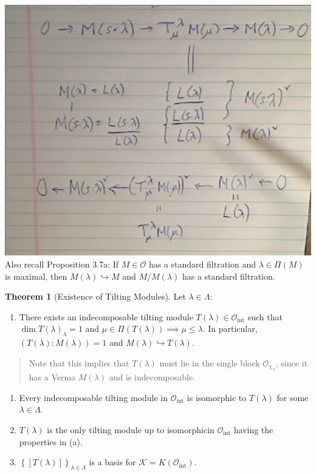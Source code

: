 \documentclass[11pt]{scrartcl}
\theoremstyle{definition}
\theoremstyle{theorem}
\newtheorem{theorem}{Theorem}[section]
\theoremstyle{proof}
\theoremstyle{definition}
\theoremstyle{break}
\theoremstyle{problem}
\providecommand{\tightlist}{%
  \setlength{\itemsep}{0pt}\setlength{\parskip}{0pt}}
\newcommand{\injects}[0]{\hookrightarrow}
\newcommand{\OO}[0]{{\mathcal{O}}}
\newcommand{\mck}[0]{{\mathcal{K}}}
\newcommand{\theset}[1]{\left\{{#1}\right\}}
\begin{document}
\includegraphics{figures/image_2020-04-24-09-25-20.png}\\

Also recall Proposition 3.7a: If \(M\in \OO\) has a standard filtration
and \(\lambda \in \Pi(M)\) is maximal, then \(M(\lambda) \injects M\)
and \(M/M(\lambda)\) has a standard filtration.

\begin{theorem}[Existence of  Tilting Modules]

Let \(\lambda \in \Lambda\):

\begin{enumerate}
\def\labelenumi{\alph{enumi}.}
\tightlist
\item
  There exists an indecomposable tilting module
  \(T(\lambda) \in \OO_{\text{int}}\) such that
  \(\dim T(\lambda)_\lambda = 1\) and
  \(\mu \in \Pi(T(\lambda)) \implies \mu \leq \lambda\). In particular,
  \(( T(\lambda): M(\lambda) ) = 1\) and
  \(M(\lambda) \injects T(\lambda)\).
\end{enumerate}

\begin{quote}
Note that this implies that \(T(\lambda)\) must lie in the single block
\(\OO_{\chi_\lambda}\), since it has a Verma \(M(\lambda)\) and is
indecomposable.
\end{quote}

\begin{enumerate}
\def\labelenumi{\alph{enumi}.}
\setcounter{enumi}{1}
\tightlist
\item
  Every indecomposable tilting module in \(\OO_{\text{int}}\) is
  isomorphic to \(T(\lambda)\) for some \(\lambda \in \Lambda\).
\item
  \(T(\lambda)\) is the only tilting module up to isomorphicin
  \(\OO_{\text{int}}\) having the properties in (a).
\item
  \(\theset{[T(\lambda)]}_{\lambda \in \Lambda}\) is a basis for
  \(\mck = K(\OO_{\text{int}})\).
\end{enumerate}

\end{theorem}
\end{document}
